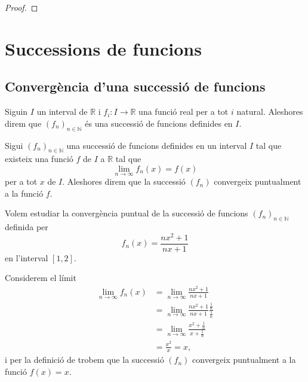\documentclass[../../Main.tex]{subfiles}
\begin{document}
\begin{theorem}
\begin{proof}
\begin{comment}
			Aleshores amb \eqref{thm:Teorema de Cauchy:eq1} i \eqref{thm:Teorema de Cauchy:eq2} tenim que
			\[\abs{\sum_{n=1}^{m}a_{\sigma(n)}b_{\tau(n)}-\sum_{n=0}^{\infty}a_{n}\sum_{n=0}^{\infty}b_{n}}+\abs{\sum_{n=0}^{N}a_{n}\sum_{n=0}^{N}b_{n}-\sum_{n=0}^{\infty}a_{n}\sum_{n=0}^{\infty}b_{n}}\leq\varepsilon,\]
			i per la desigualtat triangular %
			\[\abs{\sum_{n=1}^{m}a_{\sigma(n)}b_{\tau(n)}-\sum_{n=0}^{N}a_{n}\sum_{n=0}^{N}b_{n}}+\abs{\sum_{n=0}^{N}a_{n}\sum_{n=0}^{N}b_{n}-\sum_{n=0}^{\infty}a_{n}\sum_{n=0}^{\infty}b_{n}}\leq\varepsilon,\]
		\end{comment}
		\end{proof}
	\end{theorem}
\section{Successions de funcions}
	\subsection{Convergència d'una successió de funcions}
	\begin{definition}
		\label{def:successió de funcions}
		Siguin \(I\) un interval de \(\mathbb{R}\) i \(f_{i}\colon I\longrightarrow\mathbb{R}\) una funció real per a tot \(i\) natural. Aleshores direm que \((f_{n})_{n\in\mathbb{N}}\) és una successió de funcions definides en \(I\).
	\end{definition}
	\begin{definition}
		\label{def:convergència puntual}
		Sigui \((f_{n})_{n\in\mathbb{N}}\) una successió de funcions definides en un interval \(I\) tal que existeix una funció \(f\) de \(I\) a \(\mathbb{R}\) tal que
		\[\lim_{n\to\infty}f_{n}(x)=f(x)\]
		per a tot \(x\) de \(I\). Aleshores direm que la successió \((f_{n})\) convergeix puntualment a la funció \(f\).
	\end{definition}
	\begin{example}
		\label{ex:convergència puntual d'una successió de funcions}
		Volem estudiar la convergència puntual de la successió de funcions \((f_{n})_{n\in\mathbb{N}}\) definida per
		\[f_{n}(x)=\frac{nx^{2}+1}{nx+1}\]
		en l'interval \([1,2]\).
		\begin{solution}
			Considerem el límit
			\begin{align*}
				\lim_{n\to\infty}f_{n}(x)&=\lim_{n\to\infty}\frac{nx^{2}+1}{nx+1} \\
				&=\lim_{n\to\infty}\frac{nx^{2}+1}{nx+1}\frac{\frac{1}{n}}{\frac{1}{n}} \\
				&=\lim_{n\to\infty}\frac{x^{2}+\frac{1}{n}}{x+\frac{1}{n}} \\
				&=\frac{x^{2}}{x}=x,
			\end{align*}
			i per la definició de  trobem que la successió \((f_{n})\) convergeix puntualment a la funció \(f(x)=x\).
		\end{solution}
	\end{example}
\end{document}
